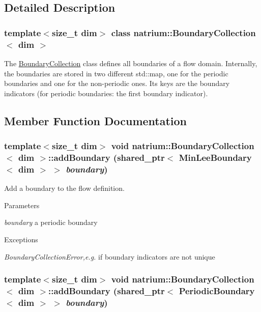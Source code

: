 \subsection{Detailed Description}
\subsubsection*{template$<$size\_\-t dim$>$ class natrium::BoundaryCollection$<$ dim $>$}

The \hyperlink{classnatrium_1_1BoundaryCollection}{BoundaryCollection} class defines all boundaries of a flow domain. Internally, the boundaries are stored in two different std::map, one for the periodic boundaries and one for the non-\/periodic ones. Its keys are the boundary indicators (for periodic boundaries: the first boundary indicator). 

\subsection{Member Function Documentation}
\hypertarget{classnatrium_1_1BoundaryCollection_ac8ad257c880937c59baad2d646392d7d}{
\subsubsection[{addBoundary}]{\setlength{\rightskip}{0pt plus 5cm}template$<$size\_\-t dim$>$ void {\bf natrium::BoundaryCollection}$<$ dim $>$::addBoundary (shared\_\-ptr$<$ {\bf MinLeeBoundary}$<$ dim $>$ $>$ {\em boundary})}}
\label{classnatrium_1_1BoundaryCollection_ac8ad257c880937c59baad2d646392d7d}


Add a boundary to the flow definition. 
\begin{DoxyParams}{Parameters}
\item[{\em boundary}]a periodic boundary \end{DoxyParams}

\begin{DoxyExceptions}{Exceptions}
\item[{\em BoundaryCollectionError,e.g.}]if boundary indicators are not unique \end{DoxyExceptions}
\hypertarget{classnatrium_1_1BoundaryCollection_a60d5efd5fa9bf2107705ee1a38508dd4}{
\subsubsection[{addBoundary}]{\setlength{\rightskip}{0pt plus 5cm}template$<$size\_\-t dim$>$ void {\bf natrium::BoundaryCollection}$<$ dim $>$::addBoundary (shared\_\-ptr$<$ {\bf PeriodicBoundary}$<$ dim $>$ $>$ {\em boundary})}}
\label{classnatrium_1_1BoundaryCollection_a60d5efd5fa9bf2107705ee1a38508dd4}



